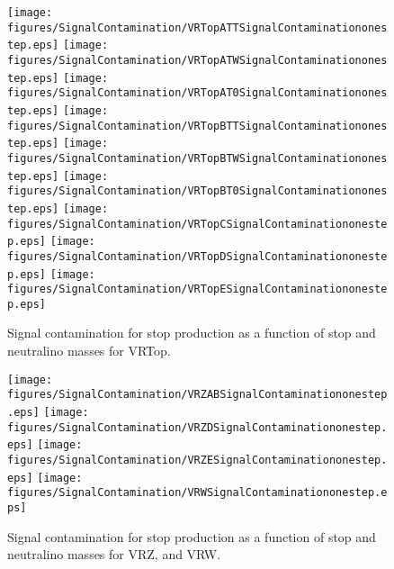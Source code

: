 \begin{figure}[htbp]
\begin{center} 
\texttt{[image: figures/SignalContamination/VRTopATTSignalContaminationonestep.eps]}
\texttt{[image: figures/SignalContamination/VRTopATWSignalContaminationonestep.eps]}
\texttt{[image: figures/SignalContamination/VRTopAT0SignalContaminationonestep.eps]}
\texttt{[image: figures/SignalContamination/VRTopBTTSignalContaminationonestep.eps]}
\texttt{[image: figures/SignalContamination/VRTopBTWSignalContaminationonestep.eps]}
\texttt{[image: figures/SignalContamination/VRTopBT0SignalContaminationonestep.eps]}
\texttt{[image: figures/SignalContamination/VRTopCSignalContaminationonestep.eps]}
\texttt{[image: figures/SignalContamination/VRTopDSignalContaminationonestep.eps]}
\texttt{[image: figures/SignalContamination/VRTopESignalContaminationonestep.eps]}
\caption{Signal contamination for stop production as a function of stop and neutralino masses for VRTop.}
\label{fig:Fit2ele}
\end{center}
\end{figure}

\begin{figure}[htbp]
\begin{center} 
\texttt{[image: figures/SignalContamination/VRZABSignalContaminationonestep.eps]}
\texttt{[image: figures/SignalContamination/VRZDSignalContaminationonestep.eps]}
\texttt{[image: figures/SignalContamination/VRZESignalContaminationonestep.eps]}
\texttt{[image: figures/SignalContamination/VRWSignalContaminationonestep.eps]}
\caption{Signal contamination for stop production as a function of stop and neutralino masses for VRZ, and VRW.}
\label{fig:Fit2ele}
\end{center}
\end{figure}



